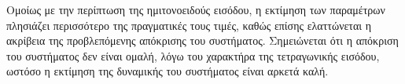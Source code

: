 \documentclass{article}
\begin{document}
Ομοίως με την περίπτωση της ημιτονοειδούς εισόδου, η εκτίμηση των παραμέτρων
πλησιάζει περισσότερο της πραγματικές τους τιμές, καθώς επίσης ελαττώνεται η ακρίβεια
της προβλεπόμενης απόκρισης του συστήματος. Σημειώνεται ότι η απόκριση του συστήματος
δεν είναι ομαλή, λόγω του χαρακτήρα της τετραγωνικής εισόδου, ωστόσο η εκτίμηση της
δυναμικής του συστήματος είναι αρκετά καλή.
\end{document}
